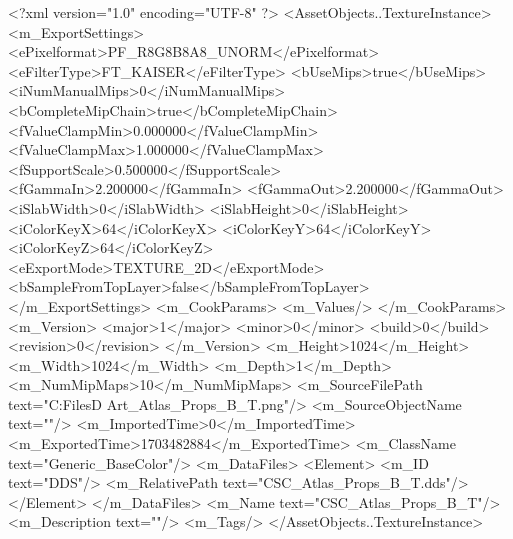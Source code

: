<?xml version="1.0" encoding="UTF-8" ?>
<AssetObjects..TextureInstance>
	<m_ExportSettings>
		<ePixelformat>PF_R8G8B8A8_UNORM</ePixelformat>
		<eFilterType>FT_KAISER</eFilterType>
		<bUseMips>true</bUseMips>
		<iNumManualMips>0</iNumManualMips>
		<bCompleteMipChain>true</bCompleteMipChain>
		<fValueClampMin>0.000000</fValueClampMin>
		<fValueClampMax>1.000000</fValueClampMax>
		<fSupportScale>0.500000</fSupportScale>
		<fGammaIn>2.200000</fGammaIn>
		<fGammaOut>2.200000</fGammaOut>
		<iSlabWidth>0</iSlabWidth>
		<iSlabHeight>0</iSlabHeight>
		<iColorKeyX>64</iColorKeyX>
		<iColorKeyY>64</iColorKeyY>
		<iColorKeyZ>64</iColorKeyZ>
		<eExportMode>TEXTURE_2D</eExportMode>
		<bSampleFromTopLayer>false</bSampleFromTopLayer>
	</m_ExportSettings>
	<m_CookParams>
		<m_Values/>
	</m_CookParams>
	<m_Version>
		<major>1</major>
		<minor>0</minor>
		<build>0</build>
		<revision>0</revision>
	</m_Version>
	<m_Height>1024</m_Height>
	<m_Width>1024</m_Width>
	<m_Depth>1</m_Depth>
	<m_NumMipMaps>10</m_NumMipMaps>
	<m_SourceFilePath text="C:\Users\Shadow\Desktop\Working Files\3D Art\Textures\CSC_Atlas_Props_B_T.png"/>
	<m_SourceObjectName text=""/>
	<m_ImportedTime>0</m_ImportedTime>
	<m_ExportedTime>1703482884</m_ExportedTime>
	<m_ClassName text="Generic_BaseColor"/>
	<m_DataFiles>
		<Element>
			<m_ID text="DDS"/>
			<m_RelativePath text="CSC_Atlas_Props_B_T.dds"/>
		</Element>
	</m_DataFiles>
	<m_Name text="CSC_Atlas_Props_B_T"/>
	<m_Description text=""/>
	<m_Tags/>
</AssetObjects..TextureInstance>

